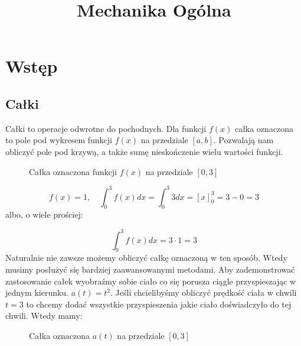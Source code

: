 \documentclass{../notatki}
\title{Mechanika Ogólna}
\begin{document}
\tableofcontents

\setcounter{section}{-1}

\section{Wstęp}

\subsection{Całki}

Całki to operacje odwrotne do pochodnych. Dla funkcji $f(x)$ całka oznaczona
to pole pod wykresem funkcji $f(x)$ na przedziale $[a, b]$. Pozwalają nam
obliczyć pole pod krzywą, a także sumę nieskończenie wielu wartości funkcji.

\begin{figure*}[ht]
  \centering
  \caption{Całka oznaczona funkcji $f(x)$ na przedziale $[0, 3]$}
\end{figure*}

$$
f(x) = 1, \quad \int_0^3 f(x) dx = \int_0^3 3 dx =\left[x\right]^3_0 = 3 - 0 = 3
$$
albo, o wiele prościej:

$$
\int_0^3 f(x) dx = 3 \cdot 1 = 3
$$
Naturalnie nie zawsze możemy obliczyć całkę oznaczoną w ten sposób. Wtedy
musimy posłużyć się bardziej zaawansowanymi metodami.
Aby zademonstrować zastosowanie całek wyobraźmy sobie ciało co się porusza
ciągle przyspieszając w jednym kierunku. $a(t) = t^2$. Jeśli chcielibyśmy
obliczyć prędkość ciała w chwili $t = 3$ to chcemy dodać wszystkie
przyspieszenia
jakie ciało doświadczyło do tej chwili. Wtedy mamy:

\begin{figure*}[ht]
  \centering
  \caption{Całka oznaczona $a(t)$ na przedziale $[0, 3]$}
\end{figure*}
\end{document}
